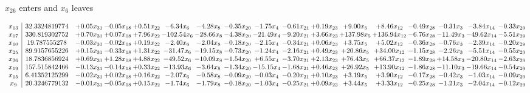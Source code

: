 \documentclass[9pt]{article}
\begin{document}
 $ x_{26} $ enters and $ x_{6} $ leaves 

 \[\begin{array}{c| c c@{\hskip 2pt} c@{\hskip 2pt} c@{\hskip 2pt} c@{\hskip 2pt} c@{\hskip 2pt} c@{\hskip 2pt} c@{\hskip 2pt} c@{\hskip 2pt} c@{\hskip 2pt} c@{\hskip 2pt} c@{\hskip 2pt} c@{\hskip 2pt} c@{\hskip 2pt} c@{\hskip 2pt} c@{\hskip 2pt} }
 x_{13}   &  32.3324819774 & +  0.05 x_{31} & -0.05 x_{18} & +  0.51 x_{22} & -6.34 x_{6} & -4.28 x_{8} & -0.35 x_{20} & -1.75 x_{4} & -0.61 x_{21} & +  0.19 x_{23} & +  9.00 x_{5} & +  8.46 x_{12} & -0.49 x_{28} & -0.31 x_{3} & -3.84 x_{14} & -0.33 x_{29}\\
 x_{17}   &  330.819302752 & +  0.70 x_{31} & +  0.07 x_{18} & +  7.96 x_{22} & -102.54 x_{6} & -28.66 x_{8} & -4.38 x_{20} & -21.49 x_{4} & -9.20 x_{21} & +  3.66 x_{23} & + 137.98 x_{5} & + 136.94 x_{12} & -6.76 x_{28} & -11.49 x_{3} & -49.62 x_{14} & -5.51 x_{29}\\
 x_{10}   &  19.787555278 & -0.03 x_{31} & -0.02 x_{18} & +  0.19 x_{22} & -2.40 x_{6} & -2.04 x_{8} & -0.18 x_{20} & -2.15 x_{4} & -0.34 x_{21} & +  0.06 x_{23} & +  3.75 x_{5} & +  5.02 x_{12} & -0.36 x_{28} & -0.76 x_{3} & -2.39 x_{14} & -0.20 x_{29}\\
 x_{25}   &  89.9157655226 & +  0.15 x_{31} & -0.33 x_{18} & +  1.31 x_{22} & -31.47 x_{6} & -19.15 x_{8} & -0.73 x_{20} & -1.24 x_{4} & -2.16 x_{21} & +  0.49 x_{23} & + 20.86 x_{5} & + 34.00 x_{12} & -1.15 x_{28} & -2.26 x_{3} & -5.51 x_{14} & -0.55 x_{29}\\
 x_{26}   &  18.7836856924 & +  0.69 x_{31} & +  1.28 x_{18} & +  4.88 x_{22} & -49.52 x_{6} & -10.09 x_{8} & -1.54 x_{20} & +  6.55 x_{4} & -3.70 x_{21} & +  2.13 x_{23} & + 76.43 x_{5} & + 66.37 x_{12} & -1.89 x_{28} & + 14.58 x_{3} & -20.80 x_{14} & -2.63 x_{29}\\
 x_{19}   &  157.515842466 & -0.13 x_{31} & -0.14 x_{18} & +  0.33 x_{22} & -13.93 x_{6} & -3.64 x_{8} & -1.34 x_{20} & -15.15 x_{4} & -1.68 x_{21} & +  0.46 x_{23} & + 26.92 x_{5} & + 13.90 x_{12} & -1.86 x_{28} & -11.10 x_{3} & -19.66 x_{14} & -0.54 x_{29}\\
 x_{15}   &  6.41352125299 & -0.02 x_{31} & +  0.02 x_{18} & +  0.16 x_{22} & -2.07 x_{6} & -0.58 x_{8} & -0.09 x_{20} & -0.03 x_{4} & -0.20 x_{21} & +  0.10 x_{23} & +  3.19 x_{5} & +  3.90 x_{12} & -0.17 x_{28} & -0.42 x_{3} & -1.03 x_{14} & -0.09 x_{29}\\
 x_{9}   &  20.3246779132 & -0.01 x_{31} & -0.05 x_{18} & +  0.15 x_{22} & -1.74 x_{6} & -1.79 x_{8} & -0.18 x_{20} & -1.03 x_{4} & -0.25 x_{21} & +  0.09 x_{23} & +  3.44 x_{5} & +  3.33 x_{12} & -0.25 x_{28} & -1.21 x_{3} & -2.04 x_{14} & -0.12 x_{29}\\

\end{array}\]
\end{document}
